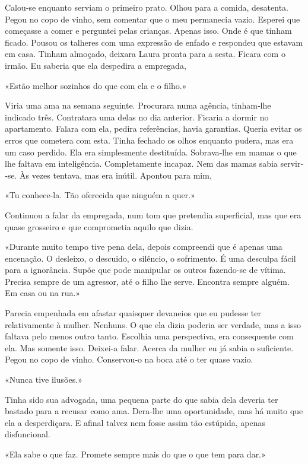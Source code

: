 Calou­‑se enquanto serviam o primeiro prato. Olhou para a comida,
desatenta. Pegou no copo de vinho, sem comentar que o meu permanecia
vazio. Esperei que começasse a comer e perguntei pelas crianças. Apenas
isso. Onde é que tinham ficado. Pousou os talheres com uma expressão de
enfado e respondeu que estavam em casa. Tinham almoçado, deixara Laura
pronta para a sesta. Ficara com o irmão. Eu saberia que ela despedira a
empregada,

«Estão melhor sozinhos do que com ela e o filho.»

Viria uma ama na semana seguinte. Procurara numa agência, tinham­‑lhe
indicado três. Contratara uma delas no dia anterior. Ficaria a dormir no
apartamento. Falara com ela, pedira referências, havia garantias. Queria
evitar os erros que cometera com esta. Tinha fechado os olhos enquanto
pudera, mas era um caso perdido. Ela era simplesmente destituída.
Sobrava­‑lhe em mamas o que lhe faltava em inteligência. Completamente
incapaz. Nem das mamas sabia servir­‑se. Às vezes tentava, mas era
inútil. Apontou para mim,

«Tu conhece­‑la. Tão oferecida que ninguém a quer.»

Continuou a falar da empregada, num tom que pretendia superficial, mas
que era quase grosseiro e que comprometia aquilo que dizia.

«Durante muito tempo tive pena dela, depois compreendi que é apenas uma
encenação. O desleixo, o descuido, o silêncio, o sofrimento. É uma
desculpa fácil para a ignorância. Supõe que pode manipular os outros
fazendo­‑se de vítima. Precisa sempre de um agressor, até o filho lhe
serve. Encontra sempre alguém. Em casa ou na rua.»

Parecia empenhada em afastar quaisquer devaneios que eu pudesse ter
relativamente à mulher. Nenhuns. O que ela dizia poderia ser verdade,
mas a isso faltava pelo menos outro tanto. Escolhia uma perspectiva, era
consequente com ela. Mas somente isso. Deixei­‑a falar. Acerca da mulher
eu já sabia o suficiente. Pegou no copo de vinho. Conservou­‑o na boca
até o ter quase vazio.

«Nunca tive ilusões.»

Tinha sido sua advogada, uma pequena parte do que sabia dela deveria ter
bastado para a recusar como ama. Dera­‑lhe uma oportunidade, mas há
muito que ela a desperdiçara. E afinal talvez nem fosse assim tão
estúpida, apenas disfuncional.

«Ela sabe o que faz. Promete sempre mais do que o que tem para dar.»

